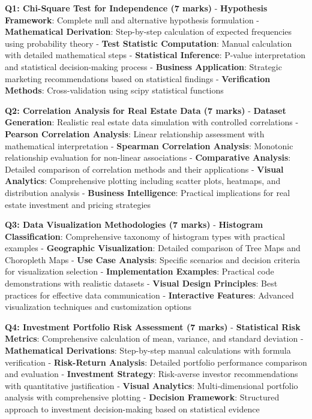 \documentclass[11pt]{article}
\begin{document}
\textbf{Q1: Chi-Square Test for Independence (7 marks)} -
\textbf{Hypothesis Framework}: Complete null and alternative hypothesis
formulation - \textbf{Mathematical Derivation}: Step-by-step calculation
of expected frequencies using probability theory - \textbf{Test
Statistic Computation}: Manual calculation with detailed mathematical
steps - \textbf{Statistical Inference}: P-value interpretation and
statistical decision-making process - \textbf{Business Application}:
Strategic marketing recommendations based on statistical findings -
\textbf{Verification Methods}: Cross-validation using scipy statistical
functions

\textbf{Q2: Correlation Analysis for Real Estate Data (7 marks)} -
\textbf{Dataset Generation}: Realistic real estate data simulation with
controlled correlations - \textbf{Pearson Correlation Analysis}: Linear
relationship assessment with mathematical interpretation -
\textbf{Spearman Correlation Analysis}: Monotonic relationship
evaluation for non-linear associations - \textbf{Comparative Analysis}:
Detailed comparison of correlation methods and their applications -
\textbf{Visual Analytics}: Comprehensive plotting including scatter
plots, heatmaps, and distribution analysis - \textbf{Business
Intelligence}: Practical implications for real estate investment and
pricing strategies

\textbf{Q3: Data Visualization Methodologies (7 marks)} -
\textbf{Histogram Classification}: Comprehensive taxonomy of histogram
types with practical examples - \textbf{Geographic Visualization}:
Detailed comparison of Tree Maps and Choropleth Maps - \textbf{Use Case
Analysis}: Specific scenarios and decision criteria for visualization
selection - \textbf{Implementation Examples}: Practical code
demonstrations with realistic datasets - \textbf{Visual Design
Principles}: Best practices for effective data communication -
\textbf{Interactive Features}: Advanced visualization techniques and
customization options

\textbf{Q4: Investment Portfolio Risk Assessment (7 marks)} -
\textbf{Statistical Risk Metrics}: Comprehensive calculation of mean,
variance, and standard deviation - \textbf{Mathematical Derivations}:
Step-by-step manual calculations with formula verification -
\textbf{Risk-Return Analysis}: Detailed portfolio performance comparison
and evaluation - \textbf{Investment Strategy}: Risk-averse investor
recommendations with quantitative justification - \textbf{Visual
Analytics}: Multi-dimensional portfolio analysis with comprehensive
plotting - \textbf{Decision Framework}: Structured approach to
investment decision-making based on statistical evidence
\end{document}
